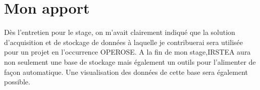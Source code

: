 \section{Mon apport}
Dès l'entretien pour le stage, on m'avait clairement indiqué que la solution d'acquisition et de stockage de données à laquelle je contribuerai sera utilisée pour un projet en l'occurrence OPEROSE. A la fin de mon stage,IRSTEA  aura non seulement une base de stockage mais également un outils pour l'alimenter de façon automatique. Une visualisation des données de cette base sera également possible.
